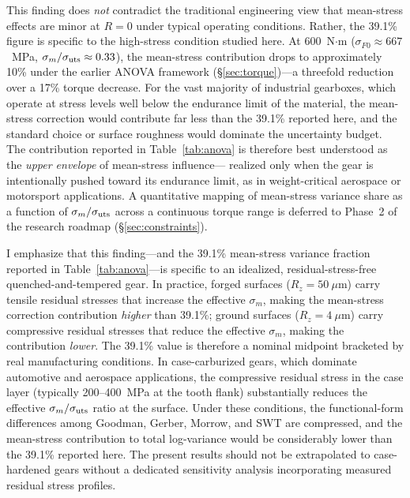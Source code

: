 \documentclass[12pt,a4paper]{article}
\begin{document}
This finding does \emph{not} contradict the traditional engineering
view that mean-stress effects are minor at $R=0$ under typical
operating conditions. Rather, the 39.1\% figure is specific to the
high-stress condition studied here. At 600~N$\cdot$m
($\sigma_{F0}\approx 667$~MPa, $\sigma_m/\sigma_{\rm uts}\approx 0.33$),
the mean-stress contribution drops to approximately 10\% under the
earlier ANOVA framework (\S\ref{sec:torque})---a threefold reduction
over a 17\% torque decrease. For the vast majority of industrial
gearboxes, which operate at stress levels well below the endurance
limit of the material, the mean-stress correction would contribute
far less than the 39.1\% reported here, and the standard choice or
surface roughness would dominate the uncertainty budget. The
contribution reported in Table~\ref{tab:anova} is therefore best
understood as the \emph{upper envelope} of mean-stress influence---
realized only when the gear is intentionally pushed toward its
endurance limit, as in weight-critical aerospace or motorsport
applications. A quantitative mapping of mean-stress variance share
as a function of $\sigma_m/\sigma_{\rm uts}$ across a continuous
torque range is deferred to Phase~2 of the research roadmap (\S\ref{sec:constraints}).

I emphasize that this finding---and the 39.1\% mean-stress variance
fraction reported in Table~\ref{tab:anova}---is specific to an
idealized, residual-stress-free quenched-and-tempered gear. In
practice, forged surfaces ($R_z=50~\mu$m) carry tensile residual
stresses that increase the effective $\sigma_m$, making the
mean-stress correction contribution \emph{higher} than 39.1\%;
ground surfaces ($R_z=4~\mu$m) carry compressive residual stresses
that reduce the effective $\sigma_m$, making the contribution
\emph{lower}. The 39.1\% value is therefore a nominal midpoint
bracketed by real manufacturing conditions. In
case-carburized gears, which dominate automotive and aerospace
applications, the compressive residual stress in the case layer
(typically 200--400~MPa at the tooth flank) substantially reduces the
effective $\sigma_m/\sigma_{\rm uts}$ ratio at the surface. Under these
conditions, the functional-form differences among Goodman, Gerber,
Morrow, and SWT are compressed, and the mean-stress contribution to
total log-variance would be considerably lower than the 39.1\% reported
here. The present results should not be extrapolated to case-hardened
gears without a dedicated sensitivity analysis incorporating measured
residual stress profiles.
\end{document}
